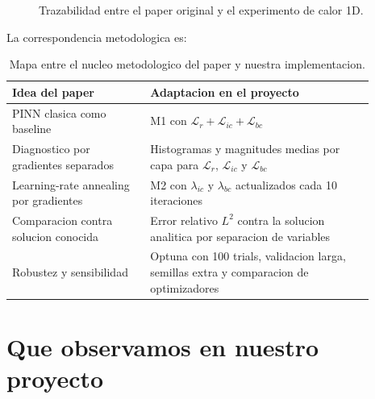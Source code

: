 \documentclass[11pt,a4paper]{article}
\begin{document}
\begin{figure}[H]
\centering
{}
\caption{Trazabilidad entre el paper original y el experimento de calor 1D.}
\end{figure}

La correspondencia metodologica es:
\begin{table}[H]
\centering
\begin{tabular}{p{0.34\linewidth}p{0.55\linewidth}}
\toprule
Idea del paper & Adaptacion en el proyecto \\
\midrule
PINN clasica como baseline & M1 con
$\mathcal{L}_r+\mathcal{L}_{ic}+\mathcal{L}_{bc}$ \\
Diagnostico por gradientes separados & Histogramas y magnitudes medias por
capa para $\mathcal{L}_r$, $\mathcal{L}_{ic}$ y $\mathcal{L}_{bc}$ \\
Learning-rate annealing por gradientes & M2 con
$\lambda_{ic}$ y $\lambda_{bc}$ actualizados cada 10 iteraciones \\
Comparacion contra solucion conocida & Error relativo $L^2$ contra la solucion
analitica por separacion de variables \\
Robustez y sensibilidad & Optuna con 100 trials, validacion larga, semillas
extra y comparacion de optimizadores \\
\bottomrule
\end{tabular}
\caption{Mapa entre el nucleo metodologico del paper y nuestra implementacion.}
\end{table}

\section{Que observamos en nuestro proyecto}
\end{document}
